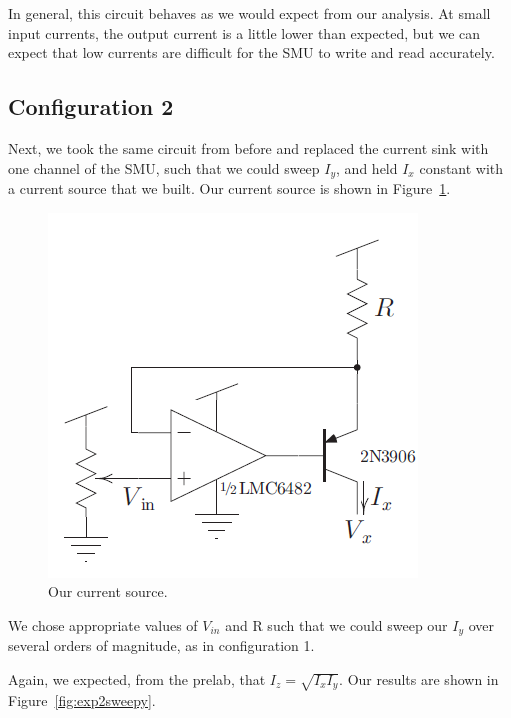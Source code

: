 \documentclass{article}
\begin{document}
In general, this circuit behaves as we would expect from our analysis.  At small input currents, the output current is a little lower than expected, but we can expect that low currents are difficult for the SMU to write and read accurately.

\subsection*{Configuration 2}

Next, we took the same circuit from before and replaced the current sink with one channel of the SMU, such that we could sweep $I_y$, and held $I_x$ constant with a current source that we built.  Our current source is shown in Figure~\ref{fig:source}.

\begin{figure}[H]
\begin{center}
\includegraphics[scale=.5]{source.png}
\caption{Our current source.}
\label{fig:source}
\end{center}
\end{figure}

We chose appropriate values of $V_{in}$ and R such that we could sweep our $I_y$ over several orders of magnitude, as in configuration 1.

Again, we expected, from the prelab, that $I_z = \sqrt{I_xI_y}$.  Our results are shown in Figure~\ref{fig:exp2sweepy}.
\end{document}
